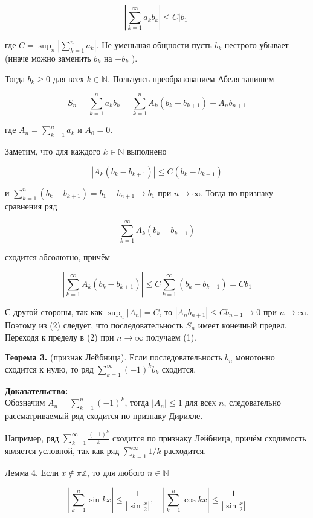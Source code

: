 \documentclass[a4paper,12pt]{article} %
\begin{document}
	$$
	\left|\sum_{k=1}^{\infty} a_{k} b_{k}\right| \leq C\left|b_{1}\right|
	$$
	
	где $C=\sup _{n}\left|\sum_{k=1}^{n} a_{k}\right|$. Не уменьшая общности пусть $b_{k}$ нестрого убывает (иначе можно заменить $b_{k}$ на $-b_{k}$ ).
	
	Тогда $b_{k} \geq 0$ для всех $k \in \mathbb{N}$. Пользуясь преобразованием Абеля запишем
	
	$$
	S_{n}=\sum_{k=1}^{n} a_{k} b_{k}=\sum_{k=1}^{n} A_{k}\left(b_{k}-b_{k+1}\right)+A_{n} b_{n+1}
	$$
	
	где $A_{n}=\sum_{k=1}^{n} a_{k}$ и $A_{0}=0$.
	
	Заметим, что для каждого $k \in \mathbb{N}$ выполнено
	
	$$
	\left|A_{k}\left(b_{k}-b_{k+1}\right)\right| \leq C\left(b_{k}-b_{k+1}\right)
	$$
	
	и $\sum_{k=1}^{n}\left(b_{k}-b_{k+1}\right)=b_{1}-b_{n+1} \rightarrow b_{1}$ при $n \rightarrow \infty$. Тогда по признаку сравнения ряд
	
	$$
	\sum_{k=1}^{\infty} A_{k}\left(b_{k}-b_{k+1}\right)
	$$
	
	сходится абсолютно, причём
	
	$$
	\left|\sum_{k=1}^{\infty} A_{k}\left(b_{k}-b_{k+1}\right)\right| \leq C \sum_{k=1}^{\infty}\left(b_{k}-b_{k+1}\right)=C b_{1}
	$$
	
	С другой стороны, так как $\sup _{n}\left|A_{n}\right|=C$, то $\left|A_{n} b_{n+1}\right| \leq C b_{n+1} \rightarrow 0$ при $n \rightarrow \infty$. Поэтому из (2) следует, что последовательность $S_{n}$ имеет конечный предел. Переходя к пределу в (2) при $n \rightarrow \infty$ получаем (1).
	
	\textbf{Теорема 3.} (признак Лейбница). Если последовательность $b_{n}$ монотонно сходится к нулю, то ряд $\sum_{k=1}^{\infty}(-1)^{k} b_{k}$ сходится.
	
	\textbf{Доказательство:\\}
	Обозначим $A_{n}=\sum_{k=1}^{n}(-1)^{k}$, тогда $\left|A_{n}\right| \leq 1$ для всех $n$, следовательно рассматриваемый ряд сходится по признаку Дирихле.
	
	Например, ряд $\sum_{k=1}^{\infty} \frac{(-1)^{k}}{k}$ сходится по признаку Лейбница, причём сходимость является условной, так как ряд $\sum_{k=1}^{\infty} 1 / k$ расходится.
	
	Лемма 4. Если $x \notin \pi \mathbb{Z}$, то для любого $n \in \mathbb{N}$
	
	$$
	\left|\sum_{k=1}^{n} \sin k x\right| \leq \frac{1}{\left|\sin \frac{x}{2}\right|}, \quad\left|\sum_{k=1}^{n} \cos k x\right| \leq \frac{1}{\left|\sin \frac{x}{2}\right|}
	$$
	
\end{document}
